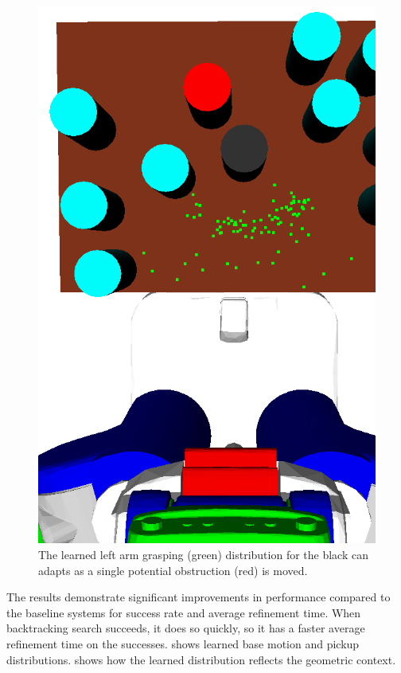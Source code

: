 \begin{figure}[t]
    \includegraphics[scale=0.13]{images/grasp_context_3.png}
  \caption{\small{The learned left arm grasping (green) distribution
      for the black can adapts as a single potential obstruction (red) is
      moved.}}
  \label{fig:context}
\end{figure}

The results demonstrate significant improvements in performance
compared to the baseline systems for success rate and average refinement time. When backtracking
search succeeds, it does so quickly, so it has a faster average
refinement time on the successes.  shows learned
base motion and pickup distributions.  shows how
the learned distribution reflects the geometric context.

